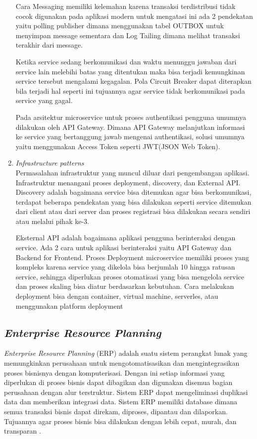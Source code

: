 \begin{enumerate}[leftmargin=1.3cm]
	Cara Messaging memiliki kelemahan karena transaksi terdistribusi tidak cocok digunakan pada aplikasi modern untuk mengatasi ini ada 2 pendekatan yaitu polling publisher dimana menggunakan tabel OUTBOX untuk menyimpan message sementara dan Log Tailing dimana melihat transaksi terakhir dari message.

	Ketika service sedang berkomunikasi dan waktu menunggu jawaban dari service lain melebihi batas yang ditentukan maka bisa terjadi kemungkinan service tersebut mengalami kegagalan. Pola Circuit Breaker dapat diterapkan bila terjadi hal seperti ini tujuannya agar service tidak berkomunikasi pada service yang gagal.

	Pada arsitektur microservice untuk proses authentikasi pengguna umumnya dilakukan oleh API Gateway. Dimana API Gateway melanjutkan informasi ke service yang bertanggung jawab mengenai authentikasi, solusi umumnya yaitu menggunakan Access Token seperti JWT(JSON Web Token).
	\item \textit{Infrastructure patterns}\\
	Permasalahan infrastruktur yang muncul diluar dari pengembangan aplikasi. Infrastruktur menangani proses deployment, discovery, dan External API. 
	Discovery adalah bagaimana service bisa ditemukan agar bisa berkomunikasi, terdapat beberapa pendekatan yang bisa dilakukan seperti service ditemukan dari client atau dari server dan proses registrasi bisa dilakukan secara sendiri atau melalui pihak ke-3.

	Eksternal API adalah bagaimana aplikasi pengguna berinteraksi dengan service.
	Ada 2 cara untuk aplikasi berinteraksi yaitu API Gateway dan Backend for Frontend. Proses Deployment microservice memiliki proses yang kompleks karena service yang dikelola bisa berjumlah 10 hingga ratusan service, sehingga diperlukan proses otomatisasi yang bisa mengelola service dan proses skaling bisa diatur berdasarkan kebutuhan. Cara melakukan deployment bisa dengan container, virtual machine, serverles, atau menggunakan platform deployment \\	
\end{enumerate}	

\subsection{\textit{Enterprise Resource Planning}}
\textit{Enterprise Resource Planning} (ERP) adalah suatu sistem perangkat lunak yang memungkinkan perusahaan untuk mengotomatisasikan dan mengintegrasikan proses bisnisnya dengan komputerisasi. Dengan ini setiap informasi yang diperlukan di proses bisnis dapat dibagikan dan digunakan disemua bagian perusahaan dengan alur terstruktur. Sistem ERP dapat mengeliminasi duplikasi data dan memberikan integrasi data. Sistem ERP memiliki database dimana semua transaksi bisnis dapat direkam, diproses, dipantau dan dilaporkan. Tujuannya agar proses bisnis bisa dilakukan dengan lebih cepat, murah, dan transparan \cite{D94}.

